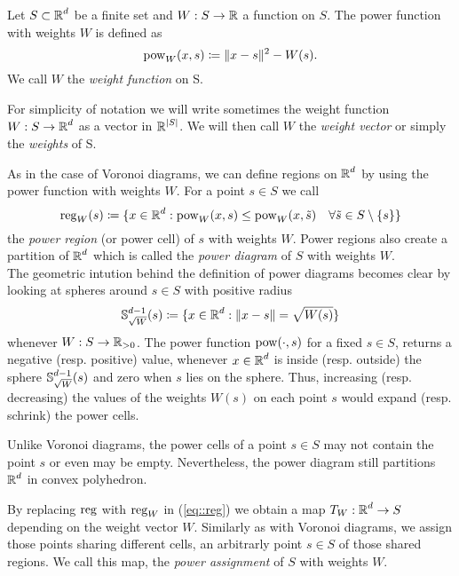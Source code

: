 \documentclass[
     12pt,         %
     a4paper,      %
     BCOR=10mm,     %
     DIV=14,        %
     ]{scrreprt}
\begin{document}
    \begin{defi}      
        Let $S\subset \operatorname{\mathbb{R}}^d$ be a finite set and $W: S \to \operatorname{\mathbb{R}} $ a function on $S$. The power function with weights $W$ is defined as
        \[ \operatorname{pow}_W(x,s) \coloneqq \|x-s\|^2 - W(s). \]
        We call $W$ the \textit{weight function} on S.
    \end{defi}
    \begin{rem}
        For simplicity of notation we will write sometimes the weight function \\ $W:S\to\operatorname{\mathbb{R}}^d$ as a vector in $\operatorname{\mathbb{R}}^{|S|}$. We will then call $W$ the \textit{weight vector} or simply the \textit{weights} of S.
    \end{rem}
    As in the case of Voronoi diagrams, we can define regions on $\operatorname{\mathbb{R}}^d$ by using the power function with weights $W$.
    For a point $s\in S$ we call 
    \[\operatorname{reg}_W(s) \coloneqq \{x \in \operatorname{\mathbb{R}}^d : \operatorname{pow}_W(x,s) \le \operatorname{pow}_W(x,\tilde s) \quad  \forall \tilde s \in S\setminus \{s\} \} \]
    the \textit{power region} (or power cell) of $s$ with weights $W$. Power regions also create a partition of $\operatorname{\mathbb{R}}^d$ which is called the \textit{power diagram} of $S$ with weights $W$. \\
    The geometric intution behind the definition of power diagrams becomes clear by looking at spheres around $s\in S$ with positive radius %
    \[\operatorname{\mathbb{S}}_{\sqrt W}^{d-1}(s) \coloneqq \{x \in \operatorname{\mathbb{R}}^d : \| x-s \| = \sqrt{W(s)} \} \]
    whenever $W : S \to \operatorname{\mathbb{R}}_{>0} $. The power function $\operatorname{pow}(\cdot, s)$ for a fixed $s\in S$, returns a negative (resp. positive) value, whenever $x\in \operatorname{\mathbb{R}}^d$ is inside 
    (resp. outside) the sphere $\operatorname{\mathbb{S}}_{\sqrt W}^{d-1}(s)$ and zero when $s$ lies on the sphere. Thus, increasing (resp. decreasing) the values of the weights $W(s)$ on each point $s$ would expand (resp. schrink)
    the power cells. 
    \begin{rem}
        Unlike Voronoi diagrams, the power cells of a point $s\in S$ may not contain the point $s$ or even may be empty. Nevertheless, the power diagram still partitions $\operatorname{\mathbb{R}}^d$ in 
        convex polyhedron.
    \end{rem}
    By replacing $\operatorname{reg}$ with $\operatorname{reg}_W$ in (\ref{eq::reg}) we obtain a map $T_W: \operatorname{\mathbb{R}}^d \to S$ depending on the weight vector $W$.  Similarly as with Voronoi diagrams, we assign those points sharing
    different cells, an arbitrarly point $s\in S$ of those shared regions. We call this map, the \textit{power assignment} of $S$ with weights $W$. \\
\end{document}
